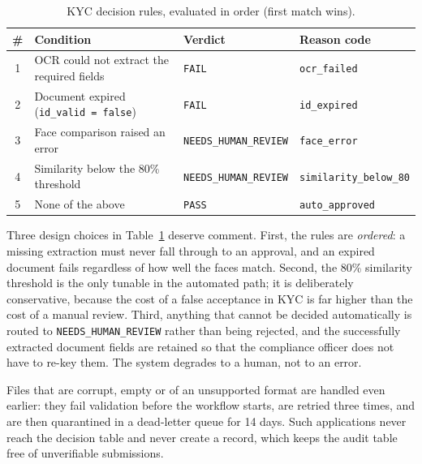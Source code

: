 \begin{table}[htbp]
  \centering
  \small
  \caption{KYC decision rules, evaluated in order (first match wins).}
  \label{tab:rules}
  \begin{tabular}{@{}clll@{}}
    \toprule
    \# & Condition & Verdict & Reason code \\
    \midrule
    1 & OCR could not extract the required fields & \texttt{FAIL} & \texttt{ocr\_failed} \\
    2 & Document expired (\texttt{id\_valid = false}) & \texttt{FAIL} & \texttt{id\_expired} \\
    3 & Face comparison raised an error & \texttt{NEEDS\_HUMAN\_REVIEW} & \texttt{face\_error} \\
    4 & Similarity below the 80\% threshold & \texttt{NEEDS\_HUMAN\_REVIEW} & \texttt{similarity\_below\_80} \\
    5 & None of the above & \texttt{PASS} & \texttt{auto\_approved} \\
    \bottomrule
  \end{tabular}
\end{table}

Three design choices in Table~\ref{tab:rules} deserve comment. First, the rules
are \emph{ordered}: a missing extraction must never fall through to an approval,
and an expired document fails regardless of how well the faces match. Second, the
80\% similarity threshold is the only tunable in the automated path; it
is deliberately conservative, because the cost of a false acceptance in KYC is
far higher than the cost of a manual review. Third, anything that cannot be
decided automatically is routed to \texttt{NEEDS\_HUMAN\_REVIEW} rather than
being rejected, and the successfully extracted document fields are retained so
that the compliance officer does not have to re-key them. The system degrades to
a human, not to an error.

Files that are corrupt, empty or of an unsupported format are handled even
earlier: they fail validation before the workflow starts, are retried three
times, and are then quarantined in a dead-letter queue for 14 days. Such
applications never reach the decision table and never create a record, which
keeps the audit table free of unverifiable submissions.
